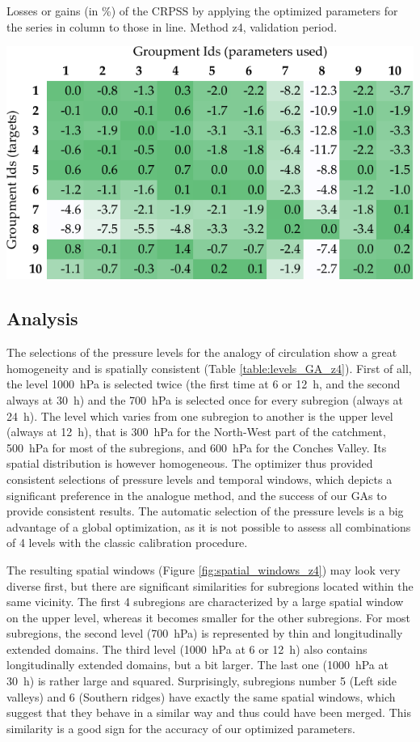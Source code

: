 \documentclass[5p]{elsarticle}
\begin{document}
\begin{table}[htb]
	\caption{Losses or gains (in \%) of the CRPSS by applying the optimized parameters for the series in column to those in line. Method z4, validation period.}
	\centerline{\includegraphics[width=\linewidth]{figures/table_crossing_z4_valid.pdf}}
	\label{table:crossing_z4_valid}
\end{table}


\subsection{Analysis}

The selections of the pressure levels for the analogy of circulation show a great homogeneity and is spatially consistent (Table \ref{table:levels_GA_z4}). First of all, the level 1000~hPa is selected twice (the first time at 6 or 12~h, and the second always at 30~h) and the 700~hPa is selected once for every subregion (always at 24~h). The level which varies from one subregion to another is the upper level (always at 12~h), that is 300~hPa for the North-West part of the catchment, 500~hPa for most of the subregions, and 600~hPa for the Conches Valley. Its spatial distribution is however homogeneous. The optimizer thus provided consistent selections of pressure levels and temporal windows, which depicts a significant preference in the analogue method, and the success of our GAs to provide consistent results. The automatic selection of the pressure levels is a big advantage of a global optimization, as it is not possible to assess all combinations of 4 levels with the classic calibration procedure.

The resulting spatial windows (Figure \ref{fig:spatial_windows_z4}) may look very diverse first, but there are significant similarities for subregions located within the same vicinity. The first 4 subregions are characterized by a large spatial window on the upper level, whereas it becomes smaller for the other subregions. For most subregions, the second level (700~hPa) is represented by thin and longitudinally extended domains. The third level (1000~hPa at 6 or 12~h) also contains longitudinally extended domains, but a bit larger. The last one (1000~hPa at 30~h) is rather large and squared. Surprisingly, subregions number 5 (Left side valleys) and 6 (Southern ridges) have exactly the same spatial windows, which suggest that they behave in a similar way and thus could have been merged. This similarity is a good sign for the accuracy of our optimized parameters.
\end{document}
